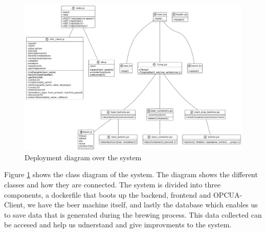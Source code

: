 
\begin{center}
    \centering
    \begin{figure}[H]
        \includegraphics[width=1\textwidth]{img/class_diagram.png}
        \caption{Deployment diagram over the system}
        \label{fig:class_diagram}
    \end{figure}
\end{center}
Figure \ref{fig:class_diagram} shows the class diagram of the system. The diagram shows the different classes and how they are connected. The system is divided into three components, a dockerfile that boots up the backend, frontend and OPCUA-Client, we have the beer machine itself, and lastly the database which enables us to save data that is generated during the brewing process. This data collected can be accesed and help us udnerstand and give improvments to the system. \newline